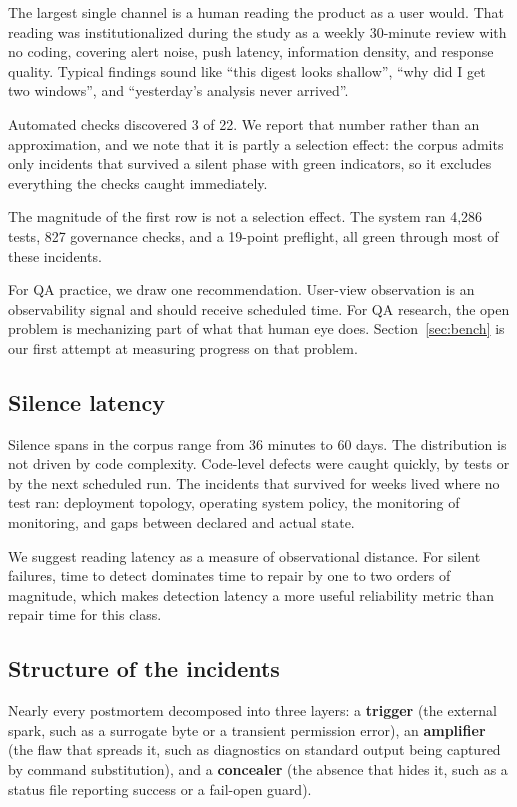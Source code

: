 \documentclass[conference]{IEEEtran}
\begin{document}
The largest single channel is a human reading the product as a user would.
That reading was institutionalized during the study as a weekly 30-minute
review with no coding, covering alert noise, push latency, information
density, and response quality. Typical findings sound like ``this digest
looks shallow'', ``why did I get two windows'', and ``yesterday's analysis
never arrived''.

Automated checks discovered 3 of 22. We report that number rather than an
approximation, and we note that it is partly a selection effect: the corpus
admits only incidents that survived a silent phase with green indicators, so
it excludes everything the checks caught immediately.

The magnitude of the first row is not a selection effect. The system ran
4{,}286 tests, 827 governance checks, and a 19-point preflight, all green
through most of these incidents.

For QA practice, we draw one recommendation. User-view observation is an
observability signal and should receive scheduled time. For QA research, the
open problem is mechanizing part of what that human eye does.
Section~\ref{sec:bench} is our first attempt at measuring progress on that
problem.

\subsection{Silence latency}

Silence spans in the corpus range from 36 minutes to 60 days. The
distribution is not driven by code complexity. Code-level defects were
caught quickly, by tests or by the next scheduled run. The incidents that
survived for weeks lived where no test ran: deployment topology, operating
system policy, the monitoring of monitoring, and gaps between declared and
actual state.

We suggest reading latency as a measure of observational distance. For
silent failures, time to detect dominates time to repair by one to two
orders of magnitude, which makes detection latency a more useful reliability
metric than repair time for this class.

\subsection{Structure of the incidents}
\label{sec:structure}

Nearly every postmortem decomposed into three layers: a \textbf{trigger}
(the external spark, such as a surrogate byte or a transient permission
error), an \textbf{amplifier} (the flaw that spreads it, such as diagnostics
on standard output being captured by command substitution), and a
\textbf{concealer} (the absence that hides it, such as a status file
reporting success or a fail-open guard).
\end{document}
